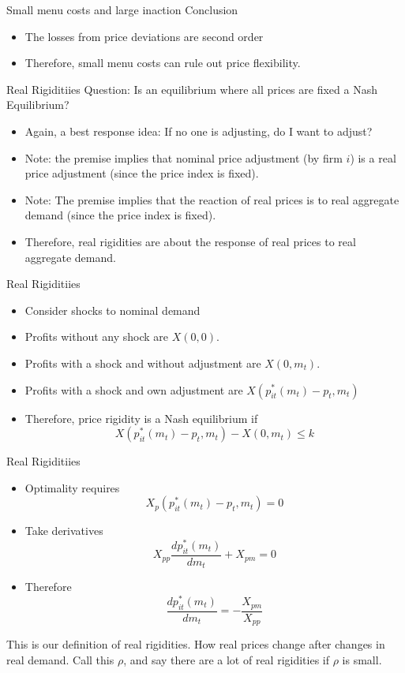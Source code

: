 \documentclass[11pt,aspectratio=169,xcolor={dvipsnames},hyperref={pdftex,pdfpagemode=UseNone,hidelinks,pdfdisplaydoctitle=true},usepdftitle=false]{beamer}
\begin{document}
\begin{frame}{Small menu costs and large inaction}
Conclusion
\begin{itemize}
\item The losses from price deviations are second order
\item Therefore, small menu costs can rule out price flexibility.
\end{itemize}
\end{frame}

\begin{frame}{Real Rigiditiies}
Question: Is an equilibrium where all prices are fixed a Nash Equilibrium?
\begin{itemize}
\item Again, a best response idea: If no one is adjusting, do I want to adjust?
\item Note: the premise implies that nominal price adjustment (by firm $i$) is a real price adjustment (since the price index is fixed).
\item Note: The premise implies that the reaction of real prices is to real aggregate demand (since the price index is fixed).
\item Therefore, real rigidities are about the response of real prices to real aggregate demand.
\end{itemize}
\end{frame}


\begin{frame}{Real Rigiditiies}
\begin{itemize}
\item Consider shocks to nominal demand
\item Profits without any shock are $X(0,0)$.
\item Profits with a shock and without adjustment are $X(0,m_t)$.
\item Profits with a shock and own adjustment are $X(p^*_{it}(m_t) - p_t,m_t)$
\item Therefore, price rigidity is a Nash equilibrium if
$$X(p^*_{it}(m_t) - p_t,m_t) - X(0,m_t) \leq k$$
\end{itemize}
\end{frame}


\begin{frame}{Real Rigiditiies}
\begin{itemize}
\item Optimality requires
$$X_p(p^*_{it}(m_t) - p_t,m_t)  = 0$$
\item Take derivatives
$$X_{pp} \frac{dp^*_{it}(m_t)}{dm_t} + X_{pm} = 0$$
\item Therefore
$$\frac{dp^*_{it}(m_t)}{dm_t} = -\frac{X_{pm}}{X_{pp}} $$
\end{itemize}
This is our definition of real rigidities. How real prices change after changes in real demand. Call this $\rho$, and say there are a lot of real rigidities if $\rho$ is small.
\end{frame}
\end{document}
